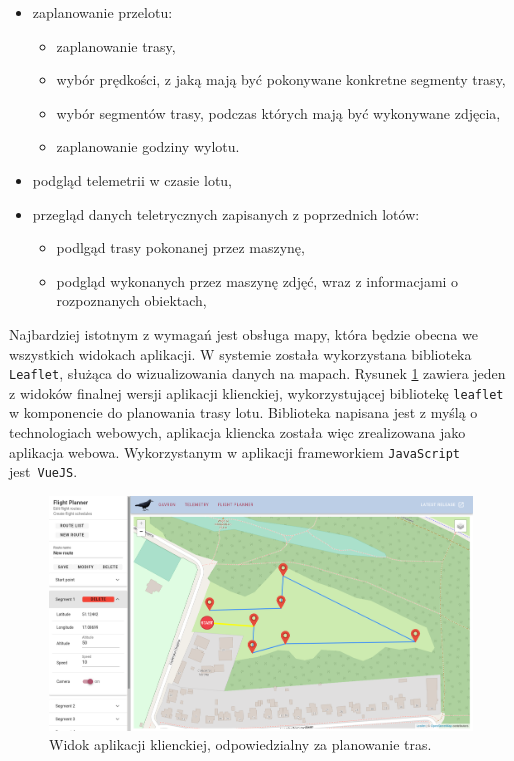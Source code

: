 \begin{itemize}
	\item zaplanowanie przelotu:
	\begin{itemize}
		\item zaplanowanie trasy,
		\item wybór prędkości, z jaką mają być pokonywane konkretne segmenty trasy,
		\item wybór segmentów trasy, podczas których mają być wykonywane zdjęcia,
		\item zaplanowanie godziny wylotu.
	\end{itemize}
	\item podgląd telemetrii w czasie lotu,
	\item przegląd danych teletrycznych zapisanych z poprzednich lotów:
	\begin{itemize}
		\item podlgąd trasy pokonanej przez maszynę,
		\item podgląd wykonanych przez maszynę zdjęć,
				wraz z informacjami o rozpoznanych obiektach,
	\end{itemize} 
\end{itemize}

Najbardziej istotnym z wymagań jest obsługa mapy, która będzie obecna we wszystkich
widokach aplikacji. W systemie została wykorzystana biblioteka \texttt{Leaflet}, 
służąca do wizualizowania danych na mapach. Rysunek \ref{frontend_flight_planner}
zawiera jeden z widoków finalnej wersji aplikacji klienckiej, wykorzystującej
bibliotekę \texttt{leaflet} w komponencie do planowania trasy lotu.
Biblioteka napisana jest z myślą o technologiach  webowych, aplikacja kliencka
została więc zrealizowana jako aplikacja webowa. Wykorzystanym w aplikacji
frameworkiem \texttt{JavaScript} jest~\texttt{VueJS}. 

\begin{figure}[H]
	\centering
	\includegraphics[width=\linewidth]{rys03/flight_planner.png}
	\caption{ Widok aplikacji klienckiej, odpowiedzialny za planowanie tras. }
	\label{frontend_flight_planner}
\end{figure}


